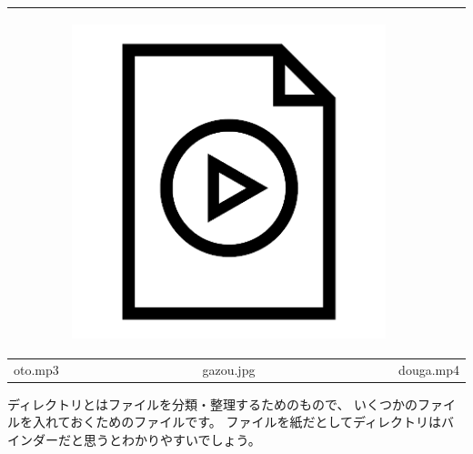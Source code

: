 \begin{table}[H]
\begin{center}
\begin{tabular}{|c|c|c|}
\begin{minipage}{0.3\hsize}
\begin{center}
      \end{center}
    \end{minipage} &
    \begin{minipage}{0.3\hsize}
      \begin{center}
        \includegraphics[width=\linewidth]{images/chap03/text03-img003.png}
      \end{center} 
    \end{minipage} \\ \hline
    oto.mp3 & gazou.jpg & douga.mp4 \\ \hline
  \end{tabular}
 \end{center}
\end{table}


ディレクトリとはファイルを分類・整理するためのもので、
いくつかのファイルを入れておくためのファイルです。
ファイルを紙だとしてディレクトリはバインダーだと思うとわかりやすいでしょう。


